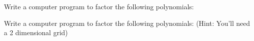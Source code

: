 Write a computer program to factor the following polynomials:

\begin{comment}
\begin{maximacode}
declare(x,mainvar)$
factorization_problem(p) := block(
   ?princ(concat("$", tex1(expand(p)), "$")),
   ?format(true, "~%
   ?princ(concat("\\textcolor{blue}{\\tt factor(", string(expand(p)), ")}")),
   ?format(true, "~%
   ?princ(concat("{Ans: $", tex1(factor(p)), "$}"))
)$
\end{maximacode}
\end{comment}







Write a computer program to factor the following polynomials:\hfil\break
\-\hspace{1cm} (Hint: You'll need a 2 dimensional grid)








